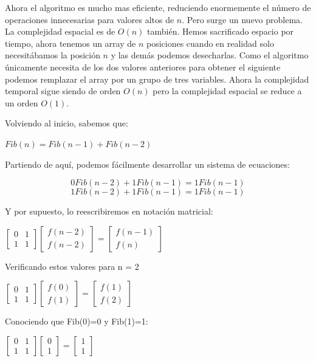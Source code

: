Ahora el algoritmo es mucho mas eficiente, reduciendo enormemente el número de operaciones innecesarias para valores altos de $n$. Pero surge un nuevo problema. La complejidad espacial es de $O(n)$ también. Hemos sacrificado espacio por tiempo, ahora tenemos un array de $n$ posiciones cuando en realidad solo necesitábamos la posición $n$ y las demás podemos desecharlas. Como el algoritmo únicamente necesita de los dos valores anteriores para obtener el siguiente podemos remplazar el array por un grupo de tres variables. Ahora la complejidad temporal sigue siendo de orden $O(n)$ pero la complejidad espacial se reduce a un orden $O(1)$.

Volviendo al inicio, sabemos que:

$Fib(n)=Fib(n-1)+Fib(n-2)$

Partiendo de aquí, podemos fácilmente desarrollar un sistema de ecuaciones:

\[ 0Fib(n-2)+1Fib(n-1)=1Fib(n-1) \]
\[ 1Fib(n-2)+1Fib(n-1)=1Fib(n-1) \]

Y por supuesto, lo reescribiremos en notación matricial:


$
\begin{bmatrix}
	0 & 1 \\ 
	1 & 1
\end{bmatrix}
\begin{bmatrix}
	f(n-2)  \\ 
	f(n-2)
\end{bmatrix}
=
\begin{bmatrix}
	f(n-1)  \\ 
	f(n)
\end{bmatrix} 
$


Verificando estos valores para n = 2


$
\begin{bmatrix}
	0 & 1 \\ 
	1 & 1
\end{bmatrix}
\begin{bmatrix}
	f(0)  \\ 
	f(1)
\end{bmatrix}
=
\begin{bmatrix}
	f(1)  \\ 
	f(2)
\end{bmatrix} 
$


Conociendo que Fib(0)=0 y Fib(1)=1:


$
\begin{bmatrix}
	0 & 1 \\ 
	1 & 1
\end{bmatrix}
\begin{bmatrix}
	0  \\ 
	1
\end{bmatrix}
=
\begin{bmatrix}
	1  \\ 
	1
\end{bmatrix} 
$


